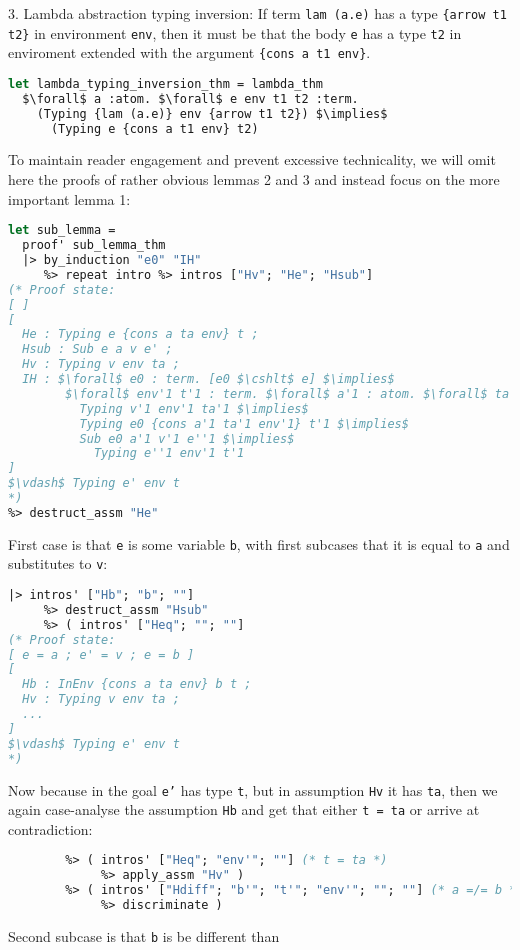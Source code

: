 \documentclass[english, mgr]{iithesis}
\renewcommand{\tt}[1]{\texttt{\small{#1}}}
\begin{document}
3. Lambda abstraction typing inversion:
If term \tt{lam (a.e)} has a type \tt{\{arrow t1 t2\}} in environment \tt{env},
then it must be that the body \tt{e} has a type \tt{t2} in enviroment extended with the argument \tt{\{cons a t1 env\}}.
\begin{lstlisting}[mathescape,language=OCaml]
let lambda_typing_inversion_thm = lambda_thm
  $\forall$ a :atom. $\forall$ e env t1 t2 :term.
    (Typing {lam (a.e)} env {arrow t1 t2}) $\implies$
      (Typing e {cons a t1 env} t2)
\end{lstlisting}
To maintain reader engagement and prevent excessive technicality, we will omit
here the proofs of rather obvious lemmas 2 and 3 and instead focus on the more
important lemma 1:
\begin{lstlisting}[mathescape, language=OCaml]
let sub_lemma =
  proof' sub_lemma_thm
  |> by_induction "e0" "IH"
     %> repeat intro %> intros ["Hv"; "He"; "Hsub"]
(* Proof state:
[ ]
[
  He : Typing e {cons a ta env} t ;
  Hsub : Sub e a v e' ;
  Hv : Typing v env ta ;
  IH : $\forall$ e0 : term. [e0 $\cshlt$ e] $\implies$
        $\forall$ env'1 t'1 : term. $\forall$ a'1 : atom. $\forall$ ta'1 v'1 e''1 : term.
          Typing v'1 env'1 ta'1 $\implies$
          Typing e0 {cons a'1 ta'1 env'1} t'1 $\implies$
          Sub e0 a'1 v'1 e''1 $\implies$
            Typing e''1 env'1 t'1
]
$\vdash$ Typing e' env t
*)
%> destruct_assm "He"
\end{lstlisting}
First case is that \tt{e} is some variable \tt{b}, with first subcases
that it is equal to \tt{a} and substitutes to \tt{v}:
\begin{lstlisting}[mathescape, language=OCaml]
  |> intros' ["Hb"; "b"; ""]
     %> destruct_assm "Hsub"
     %> ( intros' ["Heq"; ""; ""]
(* Proof state:
[ e = a ; e' = v ; e = b ]
[
  Hb : InEnv {cons a ta env} b t ;
  Hv : Typing v env ta ;
  ...
]
$\vdash$ Typing e' env t
*)
\end{lstlisting}
Now because in the goal \tt{e'} has type \tt{t}, but in assumption \tt{Hv} it
has \tt{ta}, then we again case-analyse the assumption \tt{Hb}
and get that either \tt{t = ta} or arrive at contradiction:
\begin{lstlisting}[mathescape, language=OCaml]
        %> destruct_assm "Hb"
        %> ( intros' ["Heq"; "env'"; ""] (* t = ta *)
             %> apply_assm "Hv" )
        %> ( intros' ["Hdiff"; "b'"; "t'"; "env'"; ""; ""] (* a =/= b *)
             %> discriminate )
        \end{lstlisting}
Second subcase is that \tt{b} is be different than
\end{document}

